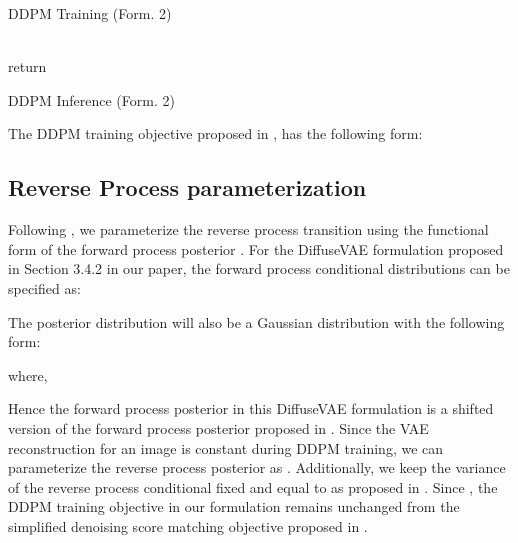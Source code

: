 \documentclass[10pt]{article} \usepackage[accepted]{tmlr}
\begin{document}
\begin{minipage}[t]{0.5\linewidth}
\null
\begin{algorithm}[H]
\begin{algorithmic}
\Repeat
      \State 
      \State 
      \State 
      \State 
      \State {}
      \State 
	\caption{DDPM Training (Form. 2)}
	\label{algo:form2_training}
\end{algorithmic}
\end{algorithm}
\end{minipage}
\begin{minipage}[t]{0.5\linewidth}
\null
\begin{algorithm}[H]
\begin{algorithmic}
\State 
      \State 
	  \State 
    	\State 
    	\State 
    	\State 
    	\State 
    	\EndFor\\
    	\State return 
	\caption{DDPM Inference (Form. 2)}
	\label{algo:form2_inference}
\end{algorithmic}
\end{algorithm}
\end{minipage}

\noindent
The DDPM training objective proposed in \citep{ho2020denoising}, has the following form:

\subsection{Reverse Process parameterization} 

Following \citep{ho2020denoising}, we parameterize the reverse process transition  using the functional form of the forward process posterior . For the DiffuseVAE formulation proposed in Section 3.4.2 in our paper, the forward process conditional distributions can be specified as:


The posterior distribution  will also be a Gaussian distribution with the following form:

where,


Hence the forward process posterior in this DiffuseVAE formulation is a shifted version of the forward process posterior proposed in \citep{ho2020denoising}. Since the VAE reconstruction  for an image  is constant during DDPM training, we can parameterize the reverse process posterior as . Additionally, we keep the variance of the reverse process conditional fixed and equal to  as proposed in \citep{ho2020denoising}. Since , the DDPM training objective in our formulation remains unchanged from the simplified denoising score matching objective proposed in \citep{ho2020denoising}.\\
\end{document}
